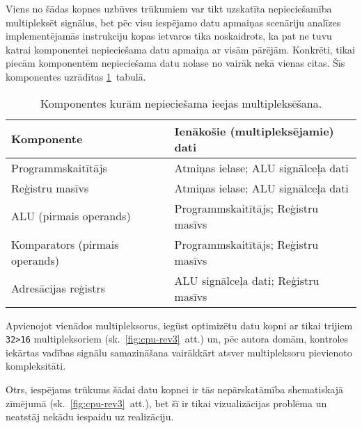 Viens no šādas kopnes uzbūves trūkumiem var tikt uzskatīta nepieciešamība
multipleksēt signālus, bet pēc visu iespējamo datu apmaiņas scenāriju analīzes
implementējamās instrukciju kopas ietvaros tika noskaidrots, ka pat ne tuvu 
katrai komponentei nepieciešama datu apmaiņa ar visām pārējām.
Konkrēti, tikai piecām komponentēm nepieciešama datu nolase no vairāk
nekā vienas citas. Šīs komponentes uzrādītas \ref{tbl:muxes}~tabulā.
\begin{table}[thb]
	\centering
	\caption{Komponentes kurām nepieciešama ieejas multipleksēšana.}
	\label{tbl:muxes}
	\begin{tabular}{ll}
		\toprule
		Komponente & Ienākošie (multipleksējamie) dati\\ 
		\midrule
		Programmskaitītājs & Atmiņas ielase; ALU signālceļa dati\\
		Reģistru masīvs & Atmiņas ielase; ALU signālceļa dati\\
		ALU (pirmais operands) & Programmskaitītājs; Reģistru masīvs\\
		Komparators (pirmais operands) & Programmskaitītājs; Reģistru masīvs\\
		Adresācijas reģistrs & ALU signālceļa dati; Reģistru masīvs\\
		\bottomrule
	\end{tabular}
\end{table}
Apvienojot vienādos multipleksorus, iegūst optimizētu datu kopni
ar tikai trijiem \texttt{32>16} multipleksoriem (sk.~\ref{fig:cpu-rev3}~att.)
un, pēc autora domām, kontroles iekārtas vadības signālu samazināšana vairākkārt
atsver multipleksoru pievienoto kompleksitāti.

Otrs, iespējams trūkums šādai datu kopnei ir tās nepārskatāmība shematiskajā
zīmējumā (sk.~\ref{fig:cpu-rev3}~att.), bet šī ir tikai vizualizācijas
problēma un neatstāj nekādu iespaidu uz realizāciju.


